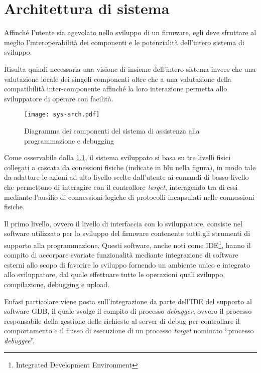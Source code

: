 \chapter{Architettura di sistema}

Affinché l'utente sia agevolato nello sviluppo di un firmware, egli deve sfruttare al meglio l'interoperabilità dei componenti e le potenzialità dell'intero sistema di sviluppo.

Risulta quindi necessaria una visione di insieme dell'intero sistema invece che una valutazione locale dei singoli componenti oltre che a una valutazione della compatibilità inter-componente affinché la loro interazione permetta allo sviluppatore di operare con facilità.

\begin{figure}[t]
    \centering
    \texttt{[image: sys-arch.pdf]}
    \caption[]{Diagramma dei componenti del sistema di assistenza alla programmazione e debugging}\label{fig:sys-arch}
\end{figure}

Come osservabile dalla \cref{fig:sys-arch}, il sistema sviluppato si basa su tre livelli fisici collegati a cascata da conessioni fisiche (indicate in blu nella figura), in modo tale da adattare le azioni ad alto livello scelte dall'utente ai comandi di basso livello che permettono di interagire con il controllore \textit{target}, interagendo tra di essi mediante l'ausilio di connessioni logiche di protocolli incapsulati nelle connessioni fisiche. 

Il primo livello, ovvero il livello di interfaccia con lo sviluppatore, consiste nel software utilizzato per lo sviluppo del firmware contenente tutti gli strumenti di supporto alla programmazione. Questi software, anche noti come IDE\footnote{Integrated Development Environment}, hanno il compito di accorpare svariate funzionalità mediante integrazione di software esterni allo scopo di favorire lo sviluppo fornendo un ambiente unico e integrato allo sviluppatore, dal quale effettuare tutte le operazioni quali sviluppo, compilazione, debugging e upload.

Enfasi particolare viene posta sull'integrazione da parte dell'IDE del supporto al software GDB, il quale svolge il compito di processo \textit{debugger}, ovvero il processo responsabile della gestione delle richieste al server di debug per controllare il comportamento e il flusso di esecuzione di un processo \textit{target} nominato ``processo \textit{debuggee}''.

